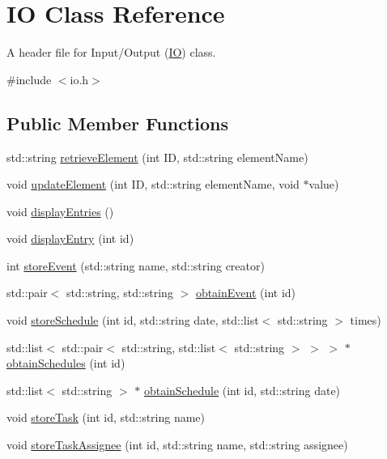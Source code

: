 \hypertarget{classIO}{}\section{IO Class Reference}
\label{classIO}


A header file for Input/\+Output (\hyperlink{classIO}{IO}) class.  




{\ttfamily \#include $<$io.\+h$>$}

\subsection*{Public Member Functions}
\begin{DoxyCompactItemize}
\item 
std\+::string \hyperlink{classIO_a3829dc8ad91e1f2d560be799b6d9b04d}{retrieve\+Element} (int ID, std\+::string element\+Name)
\item 
void \hyperlink{classIO_a11fdb7d4afa830fa1441fbf566f73432}{update\+Element} (int ID, std\+::string element\+Name, void $\ast$value)
\item 
void \hyperlink{classIO_a48e9febfbb2c6c3e01b467fd030c2529}{display\+Entries} ()
\item 
void \hyperlink{classIO_ad7d41c6f82af93956476883f9291a444}{display\+Entry} (int id)
\item 
int \hyperlink{classIO_ac9a8c18ea44f8ced444effc51633e4d7}{store\+Event} (std\+::string name, std\+::string creator)
\item 
std\+::pair$<$ std\+::string, std\+::string $>$ \hyperlink{classIO_a1a083567d802a67de01512353a64882f}{obtain\+Event} (int id)
\item 
void \hyperlink{classIO_a9030b5cd77c0b621f8ecd36d1bc6b36d}{store\+Schedule} (int id, std\+::string date, std\+::list$<$ std\+::string $>$ times)
\item 
std\+::list$<$ std\+::pair$<$ std\+::string, std\+::list$<$ std\+::string $>$ $>$ $>$ $\ast$ \hyperlink{classIO_ae36363fbeda79e6e3f962d9e985eb23b}{obtain\+Schedules} (int id)
\item 
std\+::list$<$ std\+::string $>$ $\ast$ \hyperlink{classIO_a2d8629709827d3797b4f26b9ef108f03}{obtain\+Schedule} (int id, std\+::string date)
\item 
void \hyperlink{classIO_ad3e9360377df2dfaa223e36aa4a8edde}{store\+Task} (int id, std\+::string name)
\item 
void \hyperlink{classIO_a3b1673598595b2140f5f893d023813be}{store\+Task\+Assignee} (int id, std\+::string name, std\+::string assignee)

\end{DoxyCompactItemize}
